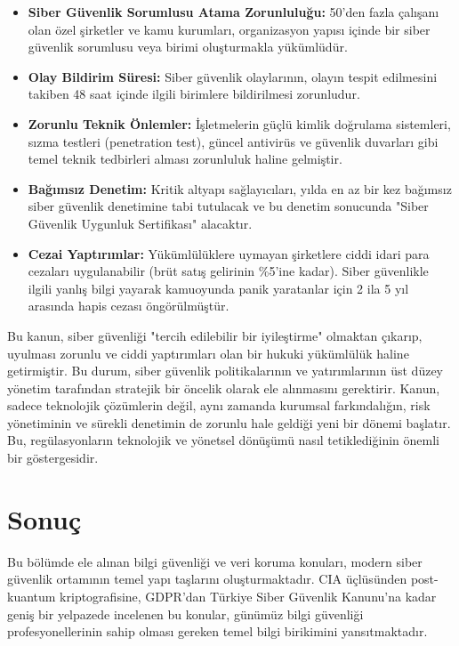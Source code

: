 \begin{itemize}
    \item \textbf{Siber Güvenlik Sorumlusu Atama Zorunluluğu:} 50'den fazla çalışanı olan özel şirketler ve kamu kurumları, organizasyon yapısı içinde bir siber güvenlik sorumlusu veya birimi oluşturmakla yükümlüdür.
    \item \textbf{Olay Bildirim Süresi:} Siber güvenlik olaylarının, olayın tespit edilmesini takiben 48 saat içinde ilgili birimlere bildirilmesi zorunludur.
    \item \textbf{Zorunlu Teknik Önlemler:} İşletmelerin güçlü kimlik doğrulama sistemleri, sızma testleri (penetration test), güncel antivirüs ve güvenlik duvarları gibi temel teknik tedbirleri alması zorunluluk haline gelmiştir.
    \item \textbf{Bağımsız Denetim:} Kritik altyapı sağlayıcıları, yılda en az bir kez bağımsız siber güvenlik denetimine tabi tutulacak ve bu denetim sonucunda "Siber Güvenlik Uygunluk Sertifikası" alacaktır.
    \item \textbf{Cezai Yaptırımlar:} Yükümlülüklere uymayan şirketlere ciddi idari para cezaları uygulanabilir (brüt satış gelirinin \%5'ine kadar). Siber güvenlikle ilgili yanlış bilgi yayarak kamuoyunda panik yaratanlar için 2 ila 5 yıl arasında hapis cezası öngörülmüştür.
\end{itemize}

Bu kanun, siber güvenliği "tercih edilebilir bir iyileştirme" olmaktan çıkarıp, uyulması zorunlu ve ciddi yaptırımları olan bir hukuki yükümlülük haline getirmiştir. Bu durum, siber güvenlik politikalarının ve yatırımlarının üst düzey yönetim tarafından stratejik bir öncelik olarak ele alınmasını gerektirir. Kanun, sadece teknolojik çözümlerin değil, aynı zamanda kurumsal farkındalığın, risk yönetiminin ve sürekli denetimin de zorunlu hale geldiği yeni bir dönemi başlatır. Bu, regülasyonların teknolojik ve yönetsel dönüşümü nasıl tetiklediğinin önemli bir göstergesidir.

\section{Sonuç}

Bu bölümde ele alınan bilgi güvenliği ve veri koruma konuları, modern siber güvenlik ortamının temel yapı taşlarını oluşturmaktadır. CIA üçlüsünden post-kuantum kriptografisine, GDPR'dan Türkiye Siber Güvenlik Kanunu'na kadar geniş bir yelpazede incelenen bu konular, günümüz bilgi güvenliği profesyonellerinin sahip olması gereken temel bilgi birikimini yansıtmaktadır.



